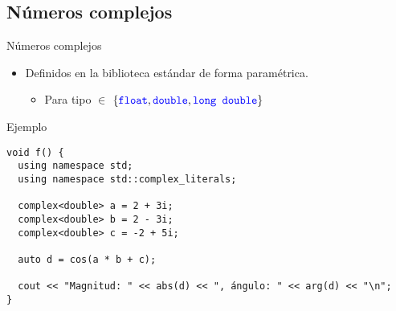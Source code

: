 \subsection{Números complejos}

\begin{frame}[t,fragile]{Números complejos}
\begin{itemize}
  \item Definidos en la biblioteca estándar de forma paramétrica.
    \begin{itemize}
      \item Para tipo  $\in$ $\{ {\color{blue}\texttt{float}}, {\color{blue}\texttt{double}}, {\color{blue}\texttt{long double}} \}$
    \end{itemize}
\end{itemize}
\begin{block}{Ejemplo}
\begin{lstlisting}
void f() {
  using namespace std;
  using namespace std::complex_literals;

  complex<double> a = 2 + 3i;
  complex<double> b = 2 - 3i;
  complex<double> c = -2 + 5i;
  
  auto d = cos(a * b + c);
 
  cout << "Magnitud: " << abs(d) << ", ángulo: " << arg(d) << "\n";
}
\end{lstlisting}
\end{block}
\end{frame}
